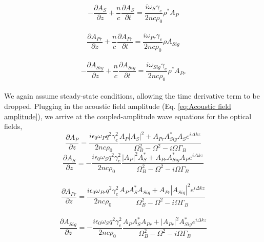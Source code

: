 \documentclass[sn-nature]{sn-jnl}%
\begin{document}
\begin{equation}
    -\frac{\partial A_{S}}{\partial z} + \frac{n}{c}\frac{\partial A_{S}}{\partial t} = \frac{i\omega_{S}\gamma_{e}}{2nc\rho_{0}}\rho^{*}A_{P}
\end{equation}
\\
\begin{equation}
    \frac{\partial A_{Pr}}{\partial z} + \frac{n}{c}\frac{\partial A_{Pr}}{\partial t} = \frac{i\omega_{Pr}\gamma_{e}}{2nc\rho_{0}}\rho A_{Sig}
\end{equation}
\\
\begin{equation}
    -\frac{\partial A_{Sig}}{\partial z} + \frac{n}{c}\frac{\partial A_{Sig}}{\partial t} = \frac{i\omega_{Sig}\gamma_{e}}{2nc\rho_{0}}\rho^{*}A_{Pr}
\end{equation}
\\
We again assume steady-state conditions, allowing the time derivative term to be dropped. Plugging in the acoustic field amplitude (Eq. \ref{eq:Acoustic field amplitude}), we arrive at the coupled-amplitude wave equations for the optical fields,
\begin{equation}
    \frac{\partial A_{P}}{\partial z} = \frac{i\epsilon_{0}\omega_{P} q^{2}\gamma_{e}^{2}}{2nc\rho_{0}}\frac{A_{P}|A_{S}|^{2} + A_{Pr}A_{Sig}^{*}A_{S}e^{i\Delta kz}}{\Omega_{B}^{2} - \Omega^{2} - i\Omega\Gamma_{B}}
\end{equation}
\begin{equation}
    \frac{\partial A_{S}}{\partial z} = -\frac{i\epsilon_{0}\omega_{S} q^{2}\gamma_{e}^{2}}{2nc\rho_{0}}\frac{|A_{P}|^{2}A_{S}^{*} + A_{Pr}A_{Sig}^{*}A_{P}e^{i\Delta kz}}{\Omega_{B}^{2} - \Omega^{2} - i\Omega\Gamma_{B}}
\end{equation}
\\
\begin{equation}
    \frac{\partial A_{Pr}}{\partial z} = \frac{i\epsilon_{0}\omega_{Pr} q^{2}\gamma_{e}^{2}}{2nc\rho_{0}}\frac{A_{P}A_{S}^{*}A_{Sig} + A_{Pr}|A_{Sig}|^{2}e^{i\Delta kz}}{\Omega_{B}^{2} - \Omega^{2} - i\Omega\Gamma_{B}}
\end{equation}
\\
\begin{equation}
    \frac{\partial A_{Sig}}{\partial z} = -\frac{i\epsilon_{0}\omega_{S} q^{2}\gamma_{e}^{2}}{2nc\rho_{0}}\frac{A_{P}A_{S}^{*}A_{Pr} + |A_{Pr}|^{2}A_{Sig}^{*}e^{i\Delta kz}}{\Omega_{B}^{2} - \Omega^{2} - i\Omega\Gamma_{B}}
    \label{eq:Signal coupled-amplitude wave equation}
\end{equation}
\end{document}

